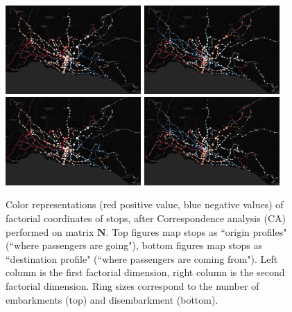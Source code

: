 \documentclass{bmcart}
\begin{document}
\begin{figure}[h]
	\includegraphics[width=0.46\textwidth]{fig/afc_in_dim1.png}
	\includegraphics[width=0.46\textwidth]{fig/afc_in_dim2.png} \\
	\includegraphics[width=0.46\textwidth]{fig/afc_out_dim1.png}
	\includegraphics[width=0.46\textwidth]{fig/afc_out_dim2.png}
	\caption{Color representations (red positive value, blue negative values) of factorial coordinates of stops, after Correspondence analysis (CA) performed on matrix $\mathbf{N}$. Top figures map stops as ``origin profiles" (``where passengers are going"), bottom figures map stops as ``destination profile" (``where passengers are coming from"). Left column is the first factorial dimension, right column is the second factorial dimension. Ring sizes correspond to the number of embarkments (top) and disembarkment (bottom).}
	\label{afc}
\end{figure}
\end{document}
